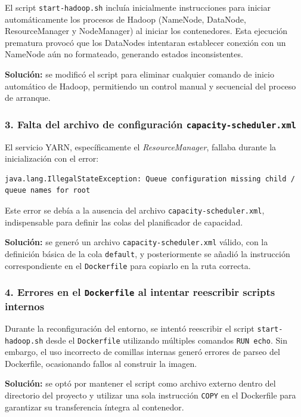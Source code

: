 El script \texttt{start-hadoop.sh} incluía inicialmente instrucciones para iniciar automáticamente los procesos de Hadoop (NameNode, DataNode, ResourceManager y NodeManager) al iniciar los contenedores. Esta ejecución prematura provocó que los DataNodes intentaran establecer conexión con un NameNode aún no formateado, generando estados inconsistentes.

\textbf{Solución:} se modificó el script para eliminar cualquier comando de inicio automático de Hadoop, permitiendo un control manual y secuencial del proceso de arranque.

\subsubsection*{3. Falta del archivo de configuración \texttt{capacity-scheduler.xml}}

El servicio YARN, específicamente el \textit{ResourceManager}, fallaba durante la inicialización con el error:

\begin{verbatim}
java.lang.IllegalStateException: Queue configuration missing child /
queue names for root
\end{verbatim}

Este error se debía a la ausencia del archivo \texttt{capacity-scheduler.xml}, indispensable para definir las colas del planificador de capacidad.

\textbf{Solución:} se generó un archivo \texttt{capacity-scheduler.xml} válido, con la definición básica de la cola \texttt{default}, y posteriormente se añadió la instrucción correspondiente en el \texttt{Dockerfile} para copiarlo en la ruta correcta.

\subsubsection*{4. Errores en el \texttt{Dockerfile} al intentar reescribir scripts internos}

Durante la reconfiguración del entorno, se intentó reescribir el script \texttt{start-hadoop.sh} desde el \texttt{Dockerfile} utilizando múltiples comandos \texttt{RUN echo}. Sin embargo, el uso incorrecto de comillas internas generó errores de parseo del Dockerfile, ocasionando fallos al construir la imagen.

\textbf{Solución:} se optó por mantener el script como archivo externo dentro del directorio del proyecto y utilizar una sola instrucción \texttt{COPY} en el Dockerfile para garantizar su transferencia íntegra al contenedor.

